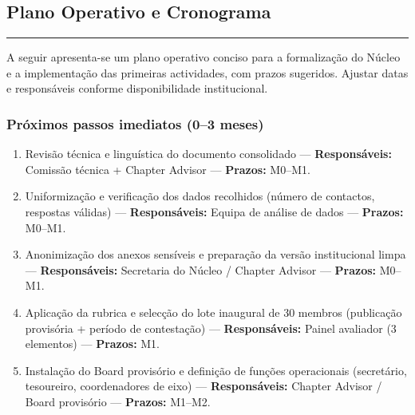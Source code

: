 \documentclass[12pt,a4paper]{article}
\begin{document}
\subsection*{Plano Operativo e Cronograma}
\textcolor{spe-secondary}{\rule{\linewidth}{0.5pt}}

\noindent A seguir apresenta-se um plano operativo conciso para a formalização do Núcleo e a implementação das primeiras actividades, com prazos sugeridos. Ajustar datas e responsáveis conforme disponibilidade institucional.

\subsubsection*{Próximos passos imediatos (0–3 meses)}
\begin{enumerate}[itemsep=0.15cm]
    \item Revisão técnica e linguística do documento consolidado — \textbf{Responsáveis:} Comissão técnica + Chapter Advisor — \textbf{Prazos:} M0–M1.
    \item Uniformização e verificação dos dados recolhidos (número de contactos, respostas válidas) — \textbf{Responsáveis:} Equipa de análise de dados — \textbf{Prazos:} M0–M1.
    \item Anonimização dos anexos sensíveis e preparação da versão institucional limpa — \textbf{Responsáveis:} Secretaria do Núcleo / Chapter Advisor — \textbf{Prazos:} M0–M1.
    \item Aplicação da rubrica e selecção do lote inaugural de 30 membros (publicação provisória + período de contestação) — \textbf{Responsáveis:} Painel avaliador (3 elementos) — \textbf{Prazos:} M1.
    \item Instalação do Board provisório e definição de funções operacionais (secretário, tesoureiro, coordenadores de eixo) — \textbf{Responsáveis:} Chapter Advisor / Board provisório — \textbf{Prazos:} M1–M2.
\end{enumerate}
\end{document}
